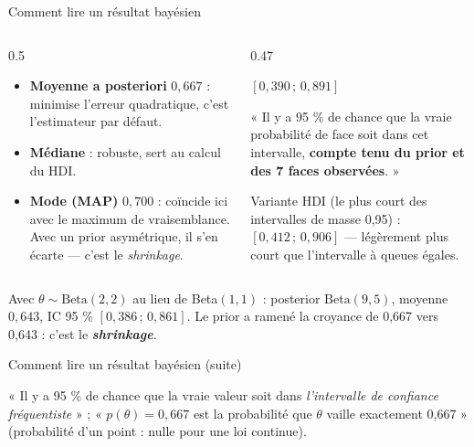 \begin{frame}{Comment lire un résultat bayésien}
\begin{columns}[t]
\begin{column}{0.5\textwidth}
\begin{kbox}
\begin{itemize}
  \item \textbf{Moyenne a posteriori} $0{,}667$ : minimise l'erreur quadratique,
        c'est l'estimateur par défaut.
  \item \textbf{Médiane} : robuste, sert au calcul du HDI.
  \item \textbf{Mode (MAP)} $0{,}700$ : coïncide ici avec le maximum de vraisemblance.
        Avec un prior asymétrique, il s'en écarte — c'est le \emph{shrinkage}.
\end{itemize}
\end{kbox}
\end{column}
\begin{column}{0.47\textwidth}
\begin{solbox}
$[0{,}390 \,;\, 0{,}891]$

\vspace{1.5mm}
\small « Il y a 95 \% de chance que la vraie probabilité de face soit dans cet intervalle,
\textbf{compte tenu du prior et des 7 faces observées}. »

\vspace{1.5mm}
Variante HDI (le plus court des intervalles de masse 0,95) : $[0{,}412 \,;\, 0{,}906]$ ---
légèrement plus court que l'intervalle à queues égales.
\end{solbox}
\end{column}
\end{columns}
\vspace{1mm}
\begin{ebox}
Avec $\theta \sim \mathrm{Beta}(2,2)$ au lieu de Beta$(1,1)$ : posterior $\mathrm{Beta}(9,5)$,
moyenne $0{,}643$, IC 95 \% $[0{,}386 \,;\, 0{,}861]$.
Le prior a ramené la croyance de 0,667 vers 0,643 : c'est le \textbf{\textit{shrinkage}}.
\end{ebox}
\vspace{1mm}
\end{frame}

\begin{frame}{Comment lire un résultat bayésien (suite)}
\begin{wbox}
\nok{} « Il y a 95 \% de chance que la vraie valeur soit dans \emph{l'intervalle de confiance
fréquentiste} » \;; \;
\nok{} « $p(\theta) = 0{,}667$ est la probabilité que $\theta$ vaille exactement 0,667 »
(probabilité d'un point : nulle pour une loi continue).
\end{wbox}
\end{frame}

